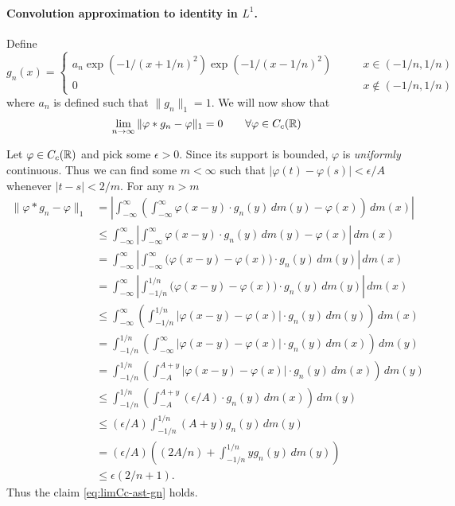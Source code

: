 \begin{enumerate}
\paragraph{Convolution approximation to identity in \(L^1\).}
Define
\begin{equation}
g_n(x) = \left\{%
\begin{array}{ll}
a_n\exp(-1/(x+1/n)^2)\exp(-1/(x-1/n)^2) \qquad & x\in (-1/n,1/n) \\
0                                       \qquad & x\notin (-1/n,1/n)
\end{array}\right.
\end{equation}
where \(a_n\) is defined such that \(\|g_n\|_1 = 1\).
We will now show that 
\begin{equation} \label{eq:limCc-ast-gn}
\lim_{n\to\infty} \|\varphi\ast g_n - \varphi\|_1 = 0
\qquad \forall \varphi \in C_c(\mathbb{R})
\end{equation}

Let \(\varphi\in C_c(\mathbb{R})\) and pick some \(\epsilon > 0\).
Since its support is bounded, \(\varphi\) is \emph{uniformly} continuous.
Thus we can find some \(m<\infty\) such that
\(|\varphi(t) - \varphi(s)|<\epsilon/A\) whenever \(|t-s|<2/m\).
For any \(n>m\)
\begin{align*}
\|\varphi \ast g_n - \varphi\|_1
&= \left| \int_{-\infty}^\infty
        \left( \int_{-\infty}^\infty 
          \varphi(x-y) \cdot g_n(y)\,dm(y) - \varphi(x)
        \right)\,dm(x) \right| \\
&\leq \int_{-\infty}^\infty
        \left| \int_{-\infty}^\infty 
          \varphi(x-y) \cdot g_n(y)\,dm(y) - \varphi(x)
        \right|\,dm(x) \\
&=    \int_{-\infty}^\infty
        \left| \int_{-\infty}^\infty 
          \bigl(\varphi(x-y) - \varphi(x)\bigr)\cdot g_n(y)\,dm(y)
        \right|\,dm(x) \\
&=    \int_{-\infty}^\infty
        \left| \int_{-1/n}^{1/n}
          \bigl(\varphi(x-y) - \varphi(x)\bigr)\cdot g_n(y)\,dm(y)
        \right|\,dm(x) \\
&\leq  \int_{-\infty}^\infty
         \left( \int_{-1/n}^{1/n}
          \bigl|\varphi(x-y) - \varphi(x)\bigr|\cdot g_n(y)\,dm(y)
         \right)\,dm(x) \\
&=    \int_{-1/n}^{1/n}
         \left( \int_{-\infty}^\infty
          \bigl|\varphi(x-y) - \varphi(x)\bigr|\cdot g_n(y)\,dm(x)
         \right)\,dm(y) \\
&=    \int_{-1/n}^{1/n}
         \left( \int_{-A}^{A+y}
          \bigl|\varphi(x-y) - \varphi(x)\bigr|\cdot g_n(y)\,dm(x)
         \right)\,dm(y) \\
&\leq  \int_{-1/n}^{1/n}
         \left( \int_{-A}^{A+y}
          (\epsilon/A)\cdot g_n(y)\,dm(x)
         \right)\,dm(y) \\
&\leq    (\epsilon/A) \int_{-1/n}^{1/n}(A+y)g_n(y)\,dm(y) \\
&=    (\epsilon/A)\left((2A/n) + \int_{-1/n}^{1/n} y g_n(y)\,dm(y)\right) \\
&\leq \epsilon(2/n + 1).
\end{align*}
Thus the claim \eqref{eq:limCc-ast-gn} holds.


\end{enumerate}

